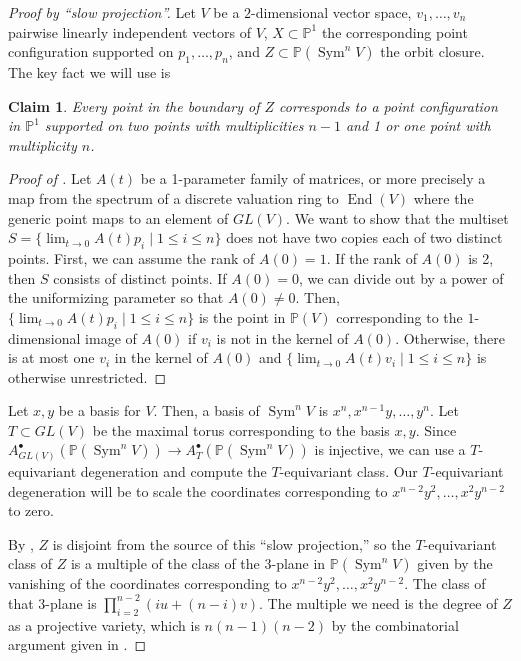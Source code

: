 \documentclass[12 pt, reqno]{amsart}
\newtheorem{clm}[thm]{Claim}
\theoremstyle{definition}
\newcommand{\on}{\operatorname}
\newcommand{\mb}{\mathbb}
\begin{document}
\begin{proof}[Proof by ``slow projection'']
  Let $V$ be a $2$-dimensional vector space, $v_1,\ldots,v_n$ pairwise
  linearly independent vectors of $V$, $X\subset\mathbb{P}^1$ the
  corresponding point configuration supported on $p_1,\ldots,p_n$, and
  $Z\subset \mathbb{P}(\on{Sym}^nV)$ the orbit closure. The key fact
  we will use is
\begin{clm}
\label{22}
Every point in the boundary of $Z$ corresponds to a point
configuration in $\mathbb{P}^1$ supported on two points with
multiplicities $n-1$ and 1 or one point with multiplicity $n$.
\end{clm}

\begin{proof}[Proof of ]
  Let $A(t)$ be a 1-parameter family of matrices, or more precisely a
  map from the spectrum of a discrete valuation ring to $\on{End}(V)$
  where the generic point maps to an element of $GL(V)$. We want to
  show that the multiset
  $S=\{\lim_{t\to 0}A(t)p_i\mid 1\leq i\leq n\}$ does not have two
  copies each of two distinct points. First, we can assume the rank of
  $A(0)=1$. If the rank of $A(0)$ is 2, then $S$ consists of distinct
  points. If $A(0)=0$, we can divide out by a power of the
  uniformizing parameter so that $A(0)\neq 0$.  Then,
  $\{\lim_{t\to 0}A(t)p_i\mid 1\leq i\leq n\}$ is the point in
  $\mb{P}(V)$ corresponding to the $1$-dimensional image of $A(0)$ if
  $v_i$ is not in the kernel of $A(0)$. Otherwise, there is at most
  one $v_i$ in the kernel of $A(0)$ and
  $\{\lim_{t\to 0}A(t)v_i\mid 1\leq i\leq n\}$ is otherwise
  unrestricted.
\end{proof}

Let $x,y$ be a basis for $V$. Then, a basis of $\on{Sym}^nV$ is
$x^n,x^{n-1}y,\ldots,y^n$. Let $T\subset GL(V)$ be the maximal torus
corresponding to the basis $x,y$. Since
$A^{\bullet}_{GL(V)}(\mathbb{P}(\on{Sym}^nV))\to
A^{\bullet}_T(\mathbb{P}(\on{Sym}^nV))$ is injective, we can use a
$T$-equivariant degeneration and compute the $T$-equivariant
class. Our $T$-equivariant degeneration will be to scale the
coordinates corresponding to $x^{n-2}y^2,\ldots,x^2y^{n-2}$ to zero.

By , $Z$ is disjoint from the source of this ``slow
projection,'' so the $T$-equivariant class of $Z$ is a multiple of the
class of the $3$-plane in $\mathbb{P}(\on{Sym}^nV)$ given by the
vanishing of the coordinates corresponding to
$x^{n-2}y^2,\ldots,x^2y^{n-2}$. The class of that $3$-plane is
$\prod_{i=2}^{n-2}{(iu+(n-i)v)}$. The multiple we need is the degree
of $Z$ as a projective variety, which is $n(n-1)(n-2)$ by the
combinatorial argument given in \cite[Introduction]{AFpoint}.
\end{proof}
\end{document}

